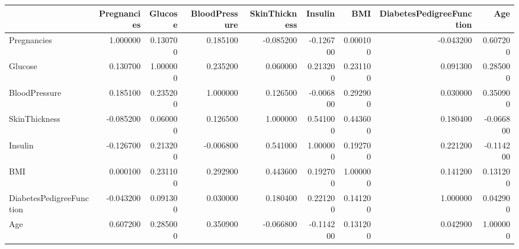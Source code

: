 \begin{tabular}{lrrrrrrrr}
\toprule
 & Pregnancies & Glucose & BloodPressure & SkinThickness & Insulin & BMI & DiabetesPedigreeFunction & Age \\
\midrule
Pregnancies & 1.000000 & 0.130700 & 0.185100 & -0.085200 & -0.126700 & 0.000100 & -0.043200 & 0.607200 \\
Glucose & 0.130700 & 1.000000 & 0.235200 & 0.060000 & 0.213200 & 0.231100 & 0.091300 & 0.285000 \\
BloodPressure & 0.185100 & 0.235200 & 1.000000 & 0.126500 & -0.006800 & 0.292900 & 0.030000 & 0.350900 \\
SkinThickness & -0.085200 & 0.060000 & 0.126500 & 1.000000 & 0.541000 & 0.443600 & 0.180400 & -0.066800 \\
Insulin & -0.126700 & 0.213200 & -0.006800 & 0.541000 & 1.000000 & 0.192700 & 0.221200 & -0.114200 \\
BMI & 0.000100 & 0.231100 & 0.292900 & 0.443600 & 0.192700 & 1.000000 & 0.141200 & 0.131200 \\
DiabetesPedigreeFunction & -0.043200 & 0.091300 & 0.030000 & 0.180400 & 0.221200 & 0.141200 & 1.000000 & 0.042900 \\
Age & 0.607200 & 0.285000 & 0.350900 & -0.066800 & -0.114200 & 0.131200 & 0.042900 & 1.000000 \\
\bottomrule
\end{tabular}
